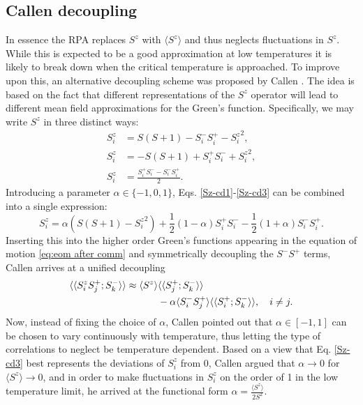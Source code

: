 \documentclass[aps,prb,reprint,floatfix,superscriptaddress]{revtex4-2}
\begin{document}
\subsection{Callen decoupling}
In essence the RPA replaces $S^z$ with $\langle S^z\rangle$ and thus neglects fluctuations in $S^z$. While this is expected to be a good approximation at low temperatures it is likely to break down when the critical temperature is approached. To improve upon this, an alternative decoupling scheme was proposed by Callen \cite{callen1963}. The idea is based on the fact that different representations of the $S^z$ operator will lead to different mean field approximations for the Green's function. Specifically, we may write $S^z$ in three distinct ways:
\begin{align}
    S_i^z &= S(S+1) - S_i^-S_i^+ - {S_i^z}^2 \label{Sz-cd1},\\
    S_i^z &= -S(S+1) + S_i^+S_i^- + {S_i^z}^2 \label{Sz-cd2},\\
    S_i^z &= \frac{S_i^+S_i^- - S_i^-S_i^+}{2} \label{Sz-cd3}.
\end{align}
Introducing a parameter $\alpha\in\{-1,0,1\}$, Eqs. \eqref{Sz-cd1}-\eqref{Sz-cd3} can be combined into a single expression:
\begin{equation}\label{Sz-cd}
    S_i^z = \alpha (S(S+1)- {S_i^z}^2) + \frac{1}{2}(1-\alpha)S_i^+S_i^- - \frac{1}{2}(1+\alpha)S_i^-S_i^+.
\end{equation}
Inserting this into the higher order Green's functions appearing in the equation of motion \eqref{eq:eom after comm} and symmetrically decoupling the $S^-S^+$ terms, Callen arrives at a unified decoupling \cite{callen1963}
\begin{align}\label{cd-approx}
    \langle \langle S_i^z S_j^+;S^-_k \rangle \rangle \approx \langle S^z \rangle &\langle \langle S_j^+;S^-_k \rangle \rangle \\ & - \alpha \langle S_i^- S_j^+ \rangle \langle \langle S_i^+; S^-_k\rangle \rangle,\quad i\neq j\notag.
\end{align}
Now, instead of fixing the choice of $\alpha$, Callen pointed out that $\alpha\in[-1,1]$ can be chosen to vary continuously with temperature, thus letting the type of correlations to neglect be temperature dependent.  
Based on a view that Eq. \eqref{Sz-cd3} best represents the deviations of $S^z_i$ from 0, Callen argued that $\alpha\rightarrow 0$ for $\langle S^z\rangle\rightarrow 0$, and in order to make fluctuations in $S^z_i$ on the order of 1 in the low temperature limit, he arrived at the functional form $\alpha=\frac{\langle S^z \rangle}{2S^2}$.
\end{document}
